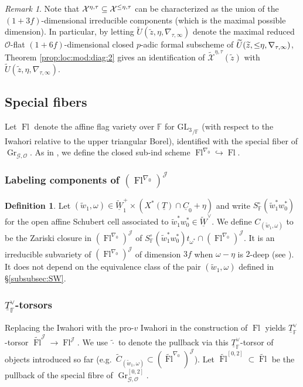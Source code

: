 \documentclass[oneside,a4paper,english, 11pt]{amsart}
\theoremstyle{plain}
\theoremstyle{plain}
\theoremstyle{plain}
\theoremstyle{plain}
\theoremstyle{plain}
\theoremstyle{plain}
\theoremstyle{definition}
\newtheorem{defn}[thm]{Definition}
\theoremstyle{definition}
\theoremstyle{definition}
\theoremstyle{remark}
\newtheorem{rmk}[thm]{Remark}
\numberwithin{equation}{section}
\newcommand{\F}{\mathbb{F}}
\newcommand{\cG}{\mathcal{G}}
\newcommand{\cJ}{\mathcal{J}}
\newcommand{\cO}{\mathcal{O}}
\newcommand{\cX}{\mathcal{X}}
\newcommand{\GL}{\mathrm{GL}}
\newcommand{\un}[1]{\underline{#1}}
\newcommand{\tld}[1]{\widetilde{#1}}
\DeclareMathOperator{\Gr}{Gr}
\DeclareMathOperator{\Fl}{Fl}
\DeclareMathOperator{\leqeta}{\text{$\setlength{\thickmuskip}{0mu}\leq\eta$}}
\newcommand{\ra}{\rightarrow}
\newcommand{\into}{\hookrightarrow}
\begin{document}
\begin{rmk}
\label{rmk:=eta}
Note that $\cX^{\eta,\tau}\subseteq \cX^{\leqeta,\tau}$ can be characterized as the union of the $(1+3f)$-dimensional irreducible components (which is the maximal possible dimension).
In particular, by letting $\tld{U}(\tld{z},\eta,\nabla_{\tau,\infty})$ denote the maximal reduced $\cO$-flat $(1+6f)$-dimensional closed $p$-adic formal subscheme of $\tld{U}(\tld{z},\leqeta,\nabla_{\tau,\infty})$, Theorem \ref{prop:loc:mod:diag:2} gives an identification of $\tld{\cX}^{\eta,\tau}(\tld{z})$ with $\tld{U}(\tld{z},\eta,\nabla_{\tau,\infty})$.
\end{rmk}
%
%



%
%



%




\subsection{Special fibers}
\label{subsub:SpFi}
%

%
Let $\Fl$ denote the affine flag variety over $\F$ for ${\GL_3}_{/\F}$ (with respect to the Iwahori relative to the upper triangular Borel),
identified with the special fiber of $\Gr_{\cG,\cO}$.
As in \cite[(4.7)]{MLM}, we define the closed sub-ind scheme $\Fl^{\nabla_0}\into \Fl$.

\subsubsection{Labeling components of $(\Fl^{\nabla_0})^{\cJ}$}
\label{subsub:Label:FL}

%

\begin{defn}
Let $(\tld{w}_1,\omega)\in \tld{\un{W}}_1^+\times (X^*(\un{T})\cap \un{C}_0+\eta)$ %
and write $S_\F^\circ(\tld{w}_1^*w_0^*)$ for the open affine Schubert cell associated to $\tld{w}_1^*w_0^*\in \tld{\un{W}}^\vee$. 
We define $C_{(\tld{w}_1,\omega)}$ to be the Zariski closure in $(\Fl^{\nabla_0})^{\cJ}$ of $S_\F^\circ(\tld{w}_1^*w_0^*)t_{\omega^*} \cap (\Fl^{\nabla_0})^{\cJ}$.
It is an irreducible subvariety of $(\Fl^{\nabla_0})^{\cJ}$ of dimension $3f$ when $\omega-\eta$ is $2$-deep (see \cite[Proposition 4.3.3]{MLM}). 
It does not depend on the equivalence class of the pair $(\tld{w}_1,\omega)$ defined in \S \ref{subsubsec:SW}.
%
\end{defn}
%
%
%
%
%
\subsubsection{$\un{T}_\F^\vee$-torsors} Replacing the Iwahori with the pro-$v$ Iwahori in the construction of $\Fl$ yields $\un{T}_\F^\vee$-torsor $\tld{\Fl}^{\cJ}\ra \Fl^{\cJ}$. 
We use $\tld{\cdot}$ to denote the pullback via this $\un{T}_\F^\vee$-torsor of objects introduced so far (e.g.~$\tld{C}_{(\tld{w}_1,\omega)} \subset (\tld{\Fl}^{\nabla_0})^{\cJ}$).
Let $\tld{\Fl}^{[0,2]}\subset \tld{\Fl}$ be the pullback of the special fibre of $\Gr^{[0,2]}_{\cG,\cO}$. 
\end{document}
